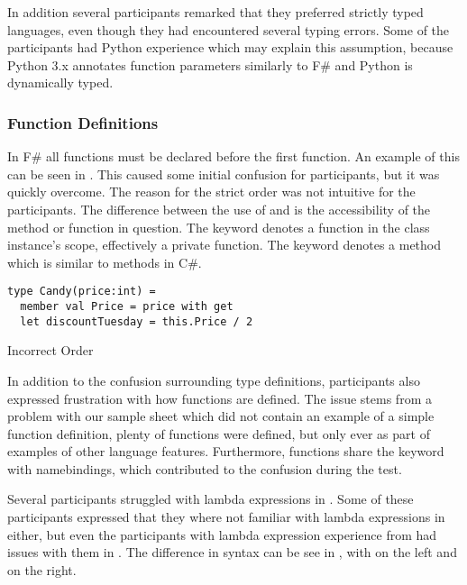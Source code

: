 In addition several participants remarked that they preferred strictly typed languages, even though they had encountered several typing errors. Some of the participants had Python experience which may explain this assumption, because Python 3.x annotates function parameters similarly to F\# and Python is dynamically typed.

\subsubsection{Function Definitions}
In F\# all  functions must be declared before the first  function. An example of this can be seen in . This caused some initial confusion for participants, but it was quickly overcome. The reason for the strict order was not intuitive for the participants. The difference between the use of  and  is the accessibility of the method or function in question. The  keyword denotes a function in the class instance's scope, effectively a private function. The  keyword denotes a method which is similar to methods in C\#.

\begin{listing}[H]
\begin{verbatim}
type Candy(price:int) =
  member val Price = price with get
  let discountTuesday = this.Price / 2
\end{verbatim}
\caption{Incorrect Order}
\label{lst:let-mem-incor}
\end{listing}

In addition to the confusion surrounding type definitions, participants also expressed frustration with how functions are defined. The issue stems from a problem with our sample sheet which did not contain an example of a simple function definition, plenty of functions were defined, but only ever as part of examples of other language features. Furthermore, functions share the  keyword with namebindings, which contributed to the confusion during the test.

Several participants struggled with lambda expressions in \fs. Some of these participants expressed that they where not familiar with lambda expressions in \cs either, but even the participants with lambda expression experience from \cs had issues with them in \fs. The difference in syntax can be see in , with \cs on the left and \fs on the right.

